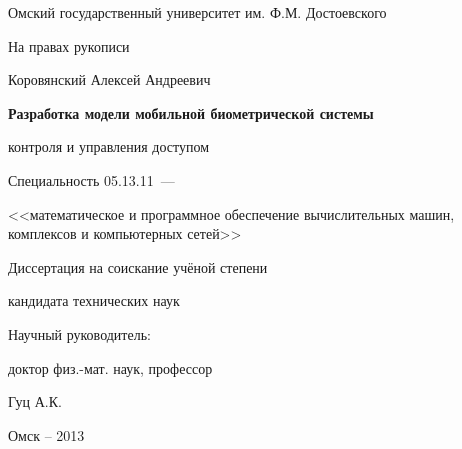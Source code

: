 \thispagestyle{empty}

\begin{center}
Омский государственный университет им. Ф.М. Достоевского
\par
\end{center}

\vspace{20mm}
\begin{flushright}
На правах рукописи

\end{flushright}

\vspace{30mm}
\begin{center}
{\large Коровянский Алексей Андреевич}
\end{center}

\vspace{5mm}
\begin{center}
{\bf \large Разработка модели мобильной биометрической системы\par
контроля и управления доступом
\par}

\vspace{10mm}
{%
Специальность 05.13.11~---

<<математическое и программное обеспечение вычислительных машин, комплексов и компьютерных сетей>>
}

\vspace{10mm}
Диссертация на соискание учёной степени

кандидата технических наук
\end{center}

\vspace{20mm}
\begin{flushright}
Научный руководитель:

доктор физ.-мат. наук, профессор

Гуц А.К.

\end{flushright}

\vspace{20mm}
\begin{center}
{Омск -- 2013}
\end{center}

\newpage